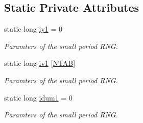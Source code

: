 \subsection*{Static Private Attributes}
\begin{DoxyCompactItemize}
\item 
static long \hyperlink{class_c_small_period_r_n_g_aa06811ff44a472047f67cc157fec2add}{iy1} = 0
\begin{DoxyCompactList}\small\item\em Paramters of the small period R\-N\-G. \end{DoxyCompactList}\item 
static long \hyperlink{class_c_small_period_r_n_g_adbc06e71f816140c47a14050087c0d35}{iv1} \mbox{[}\hyperlink{_random_generators_8h_a0e93cfb2d62849853fd34957ba6e6fdc}{N\-T\-A\-B}\mbox{]}
\begin{DoxyCompactList}\small\item\em Paramters of the small period R\-N\-G. \end{DoxyCompactList}\item 
static long \hyperlink{class_c_small_period_r_n_g_a71f1b2a5e8fb9ea6b7dca1086b2ee407}{idum1} = 0
\begin{DoxyCompactList}\small\item\em Paramters of the small period R\-N\-G. \end{DoxyCompactList}\end{DoxyCompactItemize}


